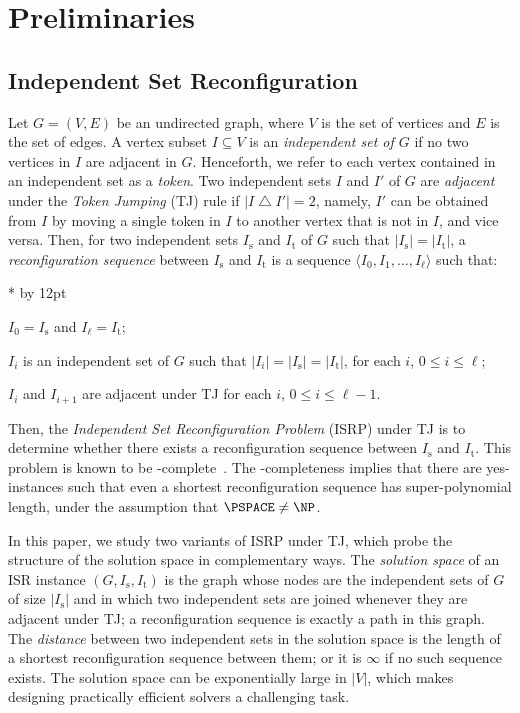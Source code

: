 \documentclass[conference]{IEEEtran}
\newenvironment{listing}[1]{%
        \begin{list}{*}{%
                 \settowidth{\labelwidth}{#1}%
                 \setlength{\leftmargin}{\labelwidth}%
                 \advance \leftmargin by 12pt
                   \setlength{\itemsep}{0pt}%
}%
}{%
\end{list}}
\newcommand{\ini}{\mathrm{s}}
\newcommand{\tar}{\mathrm{t}}
\begin{document}
\section{Preliminaries}
\label{sec:preliminaries}

\subsection{Independent Set Reconfiguration}
\label{subsec:isr}

Let $G=(V,E)$ be an undirected graph, where $V$ is the set of vertices and $E$
is the set of edges. A vertex subset $I\subseteq V$ is an \emph{independent set
of $G$} if no two vertices in $I$ are adjacent in $G$.
Henceforth, we refer to each vertex contained in an independent set as a
\emph{token}.
Two independent sets $I$ and $I'$ of $G$ are \emph{adjacent} under the
\emph{Token Jumping} (TJ) rule if $|I \bigtriangleup I'| = 2$, namely, $I'$ can
be obtained from $I$ by moving a single token in $I$ to another vertex that is
not in $I$, and vice versa.
Then, for two independent sets $I_\ini$ and $I_\tar$ of $G$ such that
$|I_\ini|=|I_\tar|$, a \emph{reconfiguration sequence} between $I_\ini$ and
$I_\tar$ is a sequence $\langle I_0, I_1, \ldots, I_\ell \rangle$ such that:
\begin{listing}{-}
\item[-] $I_0 = I_\ini$ and $I_\ell = I_\tar$;
\item[-] $I_i$ is an independent set of $G$ such that $|I_i| = |I_\ini| = |I_\tar|$, for each $i$, $0 \leq i \leq \ell$;
\item[-] $I_i$ and $I_{i+1}$ are adjacent under TJ for each $i$, $0 \le i \le \ell-1$.
\end{listing}
Then, the \emph{Independent Set Reconfiguration Problem} (ISRP) under TJ is to
determine whether there exists a reconfiguration sequence between $I_\ini$ and
$I_\tar$. This problem is known to be \PSPACE-complete~\cite{kamemi12}.
The \PSPACE-completeness implies that there are yes-instances such that even a
shortest reconfiguration sequence has super-polynomial length, under the
assumption that $\PSPACE \neq \NP$.

In this paper, we study two variants of ISRP under TJ, which probe the structure
of the solution space in complementary ways.
The \emph{solution space} of an ISR instance $(G, I_\ini, I_\tar)$ is the graph whose nodes are the
independent sets of $G$ of size $|I_\ini|$ and in which two independent sets are
joined whenever they are adjacent under TJ; a reconfiguration sequence is exactly
a path in this graph. The \emph{distance} between two independent sets in the
solution space is the length of a shortest reconfiguration sequence between them;
or it is $\infty$ if no such sequence exists. The solution space can be exponentially
large in $|V|$, which makes designing practically efficient solvers a challenging
task.
\end{document}
